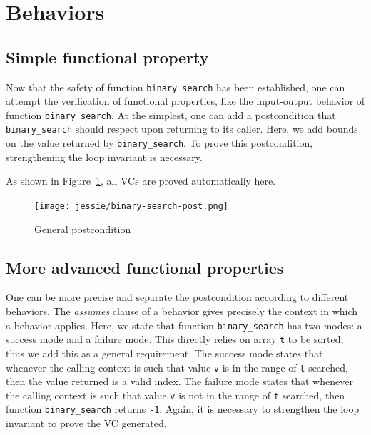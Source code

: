\documentclass[a4paper,11pt,twoside,openright]{report}
\newcommand{\negtenthspace}{\hspace*{-0.1\linewidth}}
\begin{document}
\section{Behaviors}

\subsection{Simple functional property}

Now that the safety of function \verb|binary_search| has been established, one
can attempt the verification of functional properties, like the
input-output behavior of function \verb|binary_search|. At the
simplest, one can add a postcondition that \verb|binary_search| should
respect upon returning to its caller. Here, we add bounds on the value
returned by \verb|binary_search|. To prove this postcondition,
strengthening the loop invariant is necessary.



As shown in Figure~\ref{fig:post}, all VCs are proved automatically here.

\begin{figure}[t]
  \begin{center}
    \negtenthspace\texttt{[image: jessie/binary-search-post.png]}
  \end{center}
  \caption{General postcondition}
  \label{fig:post}
  \hrulefill
\end{figure}

\subsection{More advanced functional properties}

One can be more precise and separate the postcondition according to
different behaviors. The \emph{assumes} clause of a behavior gives
precisely the context in which a behavior applies. Here, we state that
function \verb|binary_search| has two modes: a success mode and a
failure mode. This directly relies on array \verb|t| to be sorted,
thus we add this as a general requirement. The success mode states
that whenever the calling context is such that value \verb|v| is in
the range of \verb|t| searched, then the value returned is a valid
index. The failure mode states that whenever the calling context is
such that value \verb|v| is not in the range of \verb|t| searched,
then function \verb|binary_search| returns \verb|-1|.  Again, it is
necessary to strengthen the loop invariant to prove the VC generated.
\end{document}
